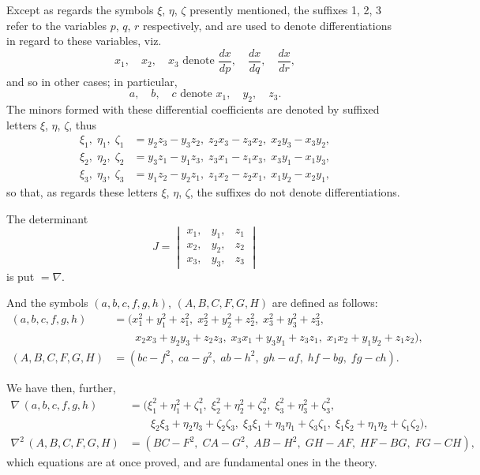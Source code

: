 \documentclass[11pt,a4paper]{article}
\theoremstyle{definition}
\theoremstyle{remark}
\begin{document}
Except as regards the symbols $\xi$, $\eta$, $\zeta$ presently mentioned, the suffixes 1, 2, 3 refer to the variables $p$, $q$, $r$ respectively, and are used to denote differentiations in regard to these variables, viz.
\[
x_1, \quad x_2, \quad x_3 \text{ denote } \frac{dx}{dp}, \quad \frac{dx}{dq}, \quad \frac{dx}{dr},
\]
and so in other cases; in particular,
\[
a, \quad b, \quad c \text{ denote } x_1, \quad y_2, \quad z_3.
\]
The minors formed with these differential coefficients are denoted by suffixed letters $\xi$, $\eta$, $\zeta$, thus
\[
\begin{aligned}
\xi_1, \; \eta_1, \; \zeta_1 &= y_2 z_3 - y_3 z_2, \; z_2 x_3 - z_3 x_2, \; x_2 y_3 - x_3 y_2, \\
\xi_2, \; \eta_2, \; \zeta_2 &= y_3 z_1 - y_1 z_3, \; z_3 x_1 - z_1 x_3, \; x_3 y_1 - x_1 y_3, \\
\xi_3, \; \eta_3, \; \zeta_3 &= y_1 z_2 - y_2 z_1, \; z_1 x_2 - z_2 x_1, \; x_1 y_2 - x_2 y_1,
\end{aligned}
\]
so that, as regards these letters $\xi$, $\eta$, $\zeta$, the suffixes do not denote differentiations.

The determinant
\[
J = \begin{vmatrix}
x_1, & y_1, & z_1 \\
x_2, & y_2, & z_2 \\
x_3, & y_3, & z_3
\end{vmatrix}
\]
is put $= \nabla$.

And the symbols $(a, b, c, f, g, h)$, $(A, B, C, F, G, H)$ are defined as follows:
\[
\begin{aligned}
(a, b, c, f, g, h) &= (x_1^2 + y_1^2 + z_1^2, \; x_2^2 + y_2^2 + z_2^2, \; x_3^2 + y_3^2 + z_3^2, \\
&\qquad x_2 x_3 + y_2 y_3 + z_2 z_3, \; x_3 x_1 + y_3 y_1 + z_3 z_1, \; x_1 x_2 + y_1 y_2 + z_1 z_2), \\
(A, B, C, F, G, H) &= (bc - f^2, \; ca - g^2, \; ab - h^2, \; gh - af, \; hf - bg, \; fg - ch).
\end{aligned}
\]

We have then, further,
\[
\begin{aligned}
\nabla \, (a, b, c, f, g, h) &= (\xi_1^2 + \eta_1^2 + \zeta_1^2, \; \xi_2^2 + \eta_2^2 + \zeta_2^2, \; \xi_3^2 + \eta_3^2 + \zeta_3^2, \\
&\qquad \xi_2 \xi_3 + \eta_2 \eta_3 + \zeta_2 \zeta_3, \; \xi_3 \xi_1 + \eta_3 \eta_1 + \zeta_3 \zeta_1, \; \xi_1 \xi_2 + \eta_1 \eta_2 + \zeta_1 \zeta_2), \\
\nabla^2 \, (A, B, C, F, G, H) &= (BC - F^2, \; CA - G^2, \; AB - H^2, \; GH - AF, \; HF - BG, \; FG - CH),
\end{aligned}
\]
which equations are at once proved, and are fundamental ones in the theory.
\end{document}
